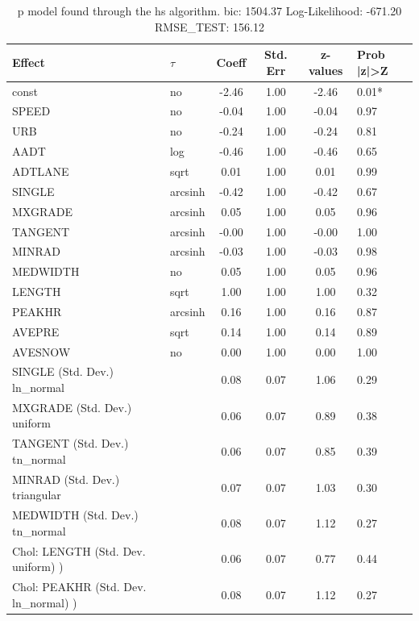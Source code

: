\begin{table}
	\caption{p model found through the hs algorithm. bic: 1504.37 Log-Likelihood: -671.20 RMSE_TEST: 156.12}
	\begin{center}
		\begin{tabular}{|l|l|c|c|c|l|}
			\hline
			Effect & $\tau$ & Coeff & Std. Err & z-values & Prob |z|>Z \\
			\hline
			const & no & -2.46 & 1.00 & -2.46 & 0.01* \\
			\hline
			SPEED & no & -0.04 & 1.00 & -0.04 & 0.97 \\
			\hline
			URB & no & -0.24 & 1.00 & -0.24 & 0.81 \\
			\hline
			AADT & log & -0.46 & 1.00 & -0.46 & 0.65 \\
			\hline
			ADTLANE & sqrt & 0.01 & 1.00 & 0.01 & 0.99 \\
			\hline
			SINGLE & arcsinh & -0.42 & 1.00 & -0.42 & 0.67 \\
			\hline
			MXGRADE & arcsinh & 0.05 & 1.00 & 0.05 & 0.96 \\
			\hline
			TANGENT & arcsinh & -0.00 & 1.00 & -0.00 & 1.00 \\
			\hline
			MINRAD & arcsinh & -0.03 & 1.00 & -0.03 & 0.98 \\
			\hline
			MEDWIDTH & no & 0.05 & 1.00 & 0.05 & 0.96 \\
			\hline
			LENGTH & sqrt & 1.00 & 1.00 & 1.00 & 0.32 \\
			\hline
			PEAKHR & arcsinh & 0.16 & 1.00 & 0.16 & 0.87 \\
			\hline
			AVEPRE & sqrt & 0.14 & 1.00 & 0.14 & 0.89 \\
			\hline
			AVESNOW & no & 0.00 & 1.00 & 0.00 & 1.00 \\
			\hline
			SINGLE (Std. Dev.) ln_normal &  & 0.08 & 0.07 & 1.06 & 0.29 \\
			\hline
			MXGRADE (Std. Dev.) uniform &  & 0.06 & 0.07 & 0.89 & 0.38 \\
			\hline
			TANGENT (Std. Dev.) tn_normal &  & 0.06 & 0.07 & 0.85 & 0.39 \\
			\hline
			MINRAD (Std. Dev.) triangular &  & 0.07 & 0.07 & 1.03 & 0.30 \\
			\hline
			MEDWIDTH (Std. Dev.) tn_normal &  & 0.08 & 0.07 & 1.12 & 0.27 \\
			\hline
			 Chol: LENGTH (Std. Dev. uniform) ) &  & 0.06 & 0.07 & 0.77 & 0.44 \\
			\hline
			 Chol: PEAKHR (Std. Dev. ln_normal) ) &  & 0.08 & 0.07 & 1.12 & 0.27 \\

\end{tabular}
\end{center}
\end{table}
